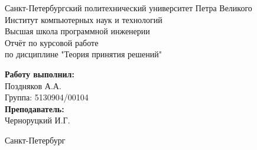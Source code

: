 \begin{titlepage}	%

	\begin{center}		%

		\large Санкт-Петербургский политехнический университет Петра Великого\\
		\large Институт компьютерных наук и технологий \\
		\large Высшая школа программной инженерии\\[8cm]
		
		\huge Отчёт по курсовой работе\\[0.5cm] %
		\large по дисциплине "Теория принятия решений"\\[5cm]

	\end{center}

	\begin{flushright} %
		\begin{minipage}{0.25\textwidth} %
			\begin{flushleft} %

				\large\textbf{Работу выполнил:}\\
				\large Поздняков А.А.\\
				\large {Группа:} 5130904/00104\\
				
				\large \textbf{Преподаватель:}\\
				\large Черноруцкий И.Г.

			\end{flushleft}
		\end{minipage}
	\end{flushright}
	
	\vfill %

	\begin{center}
	\large Санкт-Петербург\\
	\large \the\year %
	\end{center} %

\end{titlepage} %

